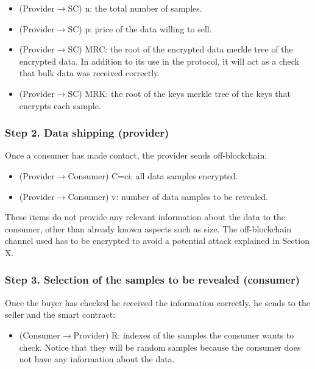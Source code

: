 \documentclass[]{article}
\begin{document}
	\begin{itemize}
		\item (Provider$\rightarrow$SC) n: the total number of samples.
		\item (Provider$\rightarrow$SC) p: price of the data willing to sell.
		\item (Provider$\rightarrow$SC) MRC: the root of the encrypted data merkle tree of the encrypted data. In addition to its use in the protocol, it will act as a check that bulk data was received correctly.
		\item (Provider$\rightarrow$SC) MRK: the root of the keys merkle tree of the keys that encrypts each sample.
	\end{itemize}
	
	\subsubsection {Step 2. Data shipping (provider)}
	Once a consumer has made contact, the provider sends off-blockchain:
	\begin{itemize}
		\item (Provider$\rightarrow$Consumer) C={ci}: all data samples encrypted.
		\item (Provider$\rightarrow$Consumer) v: number of data samples to be revealed.	
	\end{itemize}
	These items do not provide any relevant information about the data to the consumer, other than already known aspects such as size. The off-blockchain channel used has to be encrypted to avoid a potential attack explained in Section X. 
	
	\subsubsection{Step 3. Selection of the samples to be revealed (consumer)}
	Once the buyer has checked he received the information correctly, he sends to the seller and the smart contract:
	\begin{itemize}
		\item (Consumer$\rightarrow$Provider) R: indexes of the samples the consumer wants to check. Notice that they will be random samples because the consumer does not have any information about the data.
	\end{itemize}
	
\end{document}
